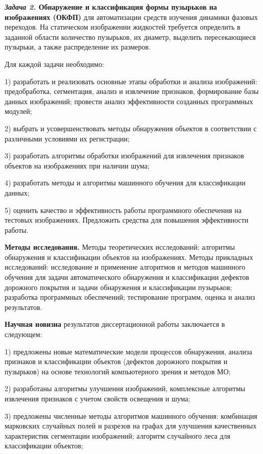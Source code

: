 \noindent\textbf{\textit{Задача 2.} Обнаружение и классификация формы пузырьков на изображениях (ОКФП)} для автоматизации средств изучения динамики фазовых переходов.  На статическом изображении жидкостей требуется определить в заданной области количество пузырьков, их диаметр, выделить пересекающиеся пузырьки, а также распределение их размеров.\vspace{0.5em}

Для каждой задачи необходимо:

1) разработать и реализовать основные этапы обработки и анализа изображений: предобработка, сегментация, анализ и извлечение признаков, формирование базы данных изображений; провести анализ эффективности созданных программных модулей;

2) выбрать и усовершенствовать методы обнаружения объектов в соответствии с различными условиями их регистрации;

3) разработать алгоритмы обработки изображений для извлечения признаков объектов на изображениях при наличии шума;

4) разработать методы и алгоритмы машинного обучения для классификации данных;

5) оценить качество и эффективность работы программного обеспечения на тестовых изображениях. Предложить средства для повышения эффективности работы.
 
\textbf{Методы исследования.} Методы теоретических исследований: алгоритмы обнаружения и классификации объектов на изображениях. Методы прикладных исследований: исследование и применение алгоритмов и методов машинного обучения для задачи автоматического обнаружения и классификации дефектов дорожного покрытия и задачи обнаружения и классификации пузырьков; разработка программных обеспечений; тестирование программ, оценка и анализ результатов.

\textbf{Научная новизна} результатов диссертационной работы заключается в следующем:

1) предложены новые математические модели процессов обнаружения, анализа признаков и классификации объектов (дефектов дорожного покрытия и пузырьков) на основе технологий компьютерного зрения и методов МО;

2) разработаны алгоритмы улучшения изображений, комплексные алгоритмы извлечения признаков с учетом свойств освещения и шума;

3) предложены численные методы алгоритмов машинного обучения: комбинация марковских случайных полей и разрезов на графах для улучшения качественных характеристик сегментации изображений; алгоритм случайного леса для классификации объектов;

